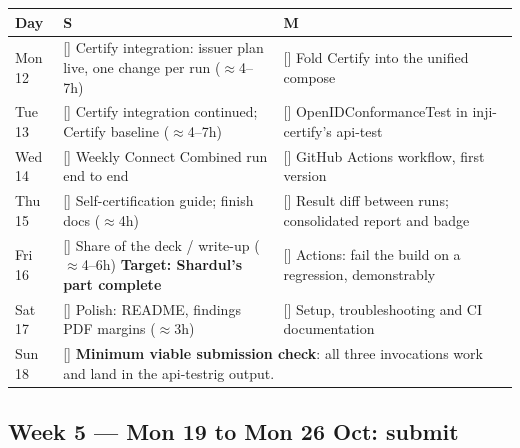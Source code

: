 \documentclass[10pt,a4paper]{article}
\newcommand{\todo}{[\phantom{x}]}
\newcommand{\Sh}{\textbf{S}}
\newcommand{\Mu}{\textbf{M}}
\begin{document}
\begin{longtable}{@{}p{1.9cm}p{6.9cm}p{7.2cm}@{}}
\toprule
Day & \Sh & \Mu\\
\midrule
\endhead
Mon 12 & \todo{} Certify integration: issuer plan live, one change per run ($\approx$4--7h) & \todo{} Fold Certify into the unified
compose\\
\addlinespace
Tue 13 & \todo{} Certify integration continued; Certify baseline ($\approx$4--7h)
& \todo{} OpenIDConformanceTest in inji-certify's api-test\\
\addlinespace
Wed 14 & \todo{} Weekly Connect\newline \todo{} Combined run end to end
& \todo{} GitHub Actions workflow, first version\\
\addlinespace
Thu 15 & \todo{} Self-certification guide; finish docs ($\approx$4h)
& \todo{} Result diff between runs; consolidated report and badge\\
\addlinespace
Fri 16 & \todo{} Share of the deck / write-up ($\approx$4--6h)\newline
\textbf{Target: Shardul's part complete}
& \todo{} Actions: fail the build on a regression, demonstrably\\
\addlinespace
Sat 17 & \todo{} Polish: README, findings PDF margins ($\approx$3h)
& \todo{} Setup, troubleshooting and CI documentation\\
\addlinespace
Sun 18 & \multicolumn{2}{p{14.2cm}}{\todo{} \textbf{Minimum viable submission check}: all three
invocations work and land in the api-testrig output.}\\
\bottomrule
\end{longtable}

\subsection{Week 5 --- Mon 19 to Mon 26 Oct: submit}
\end{document}
